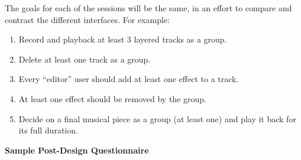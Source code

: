 \documentclass[10pt]{article}
\begin{document}
\vspace{0.5in}

\noindent
The goals for each of the sessions will be the same, in an effort
to compare and contrast the different interfaces.
For example:

\begin{enumerate}

\item Record and playback at least 3 layered tracks as a group.

\item Delete at least one track as a group.

\item Every ``editor'' user should add at least one effect to a track.

\item At least one effect should be removed by the group.

\item Decide on a final musical piece as a group (at least one) and 
  play it back for its full duration.

 \end{enumerate}
% 
% 
% 
% 
% 
% 
% 
% 
% 

\newpage

\noindent
{\bf {\Large Sample Post-Design Questionnaire}}

\vspace{0.1in}
\end{document}

